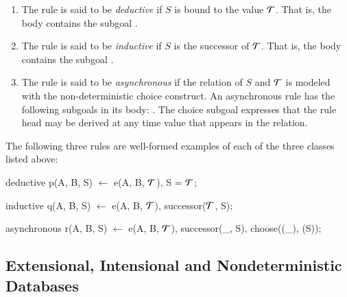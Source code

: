 \begin{enumerate}

\item The rule is said to be \emph{deductive} if $S$ is
bound to the value $\Tau$.  That is, the body contains the subgoal
.

\item The rule is said to be {\em inductive} if $S$ is the successor
of $\Tau$.  That is, the body contains the subgoal
.

\item The rule is said to be {\em asynchronous} if the relation of $S$ and
$\Tau$ is modeled with the non-deterministic choice construct.  An asynchronous rule
has the following subgoals in its body: .  The choice subgoal expresses that the rule head may
be derived at any time value that appears in the  relation.


\end{enumerate}


\begin{example}

The following three rules are well-formed examples of each of the three classes
listed above:

\begin{Dedalus}
deductive
p(A, B, S) \(\leftarrow\)
  e(A, B, \(\Tau\)),
  S = \(\Tau\);

inductive 
q(A, B, S) \(\leftarrow\)
  e(A, B, \(\Tau\)),
  successor(\(\Tau\), S);

asynchronous
r(A, B, S) \(\leftarrow\)
  e(A, B, \(\Tau\)),
  successor(_, S),
  choose((_), (S));
  
\end{Dedalus}
\end{example}


\subsection{Extensional, Intensional and Nondeterministic Databases}

